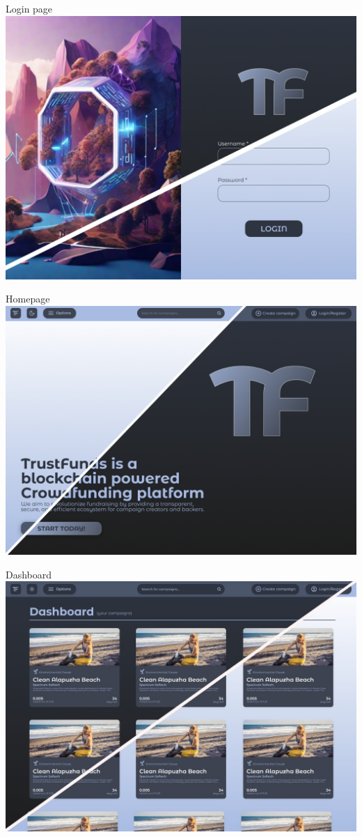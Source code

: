 \documentclass{beamer}
\begin{document}
\begin{frame}{Login page}
    \includegraphics[width=\linewidth]{assets/ui/login.png} 
\end{frame}
\begin{frame}{Homepage}
    \includegraphics[width=\linewidth]{assets/ui/homepage.png} 
\end{frame}
\begin{frame}{Dashboard}
    \includegraphics[width=\linewidth]{assets/ui/dashboard.jpeg} 
\end{frame}
\end{document}

